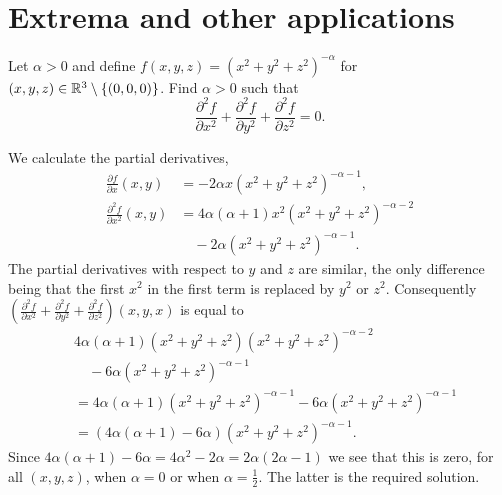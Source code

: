\section{Extrema and other applications}

\begin{task}
    Let \(\alpha>0\) and define \(f(x,y,z) = {(x^2 + y^2 + z^2)}^{-\alpha}\) for \((x,y,z)\in \mathbb{R}^3 \setminus \{(0,0,0)\}\).
    Find \(\alpha>0\) such that
    \[
        \frac{\partial^2 f}{\partial x^2} + \frac{\partial^2 f}{\partial y^2}  +\frac{\partial^2 f}{\partial z^2}  =0.
    \]
\end{task}

\begin{solution}
    We calculate the partial derivatives,
    \[
        \begin{aligned}
            \tfrac{\partial f}{\partial x}(x,y)
             & = -2 \alpha x{(x^2 + y^2 + z^2)}^{-\alpha-1},           \\
            \tfrac{\partial^2 f}{\partial x^2}(x,y)
             & = 4 \alpha(\alpha+1) x^2{(x^2 + y^2 + z^2)}^{-\alpha-2} \\
             & \quad -2 \alpha {(x^2 + y^2 + z^2)}^{-\alpha-1}.
        \end{aligned}
    \]
    The partial derivatives with respect to \(y\) and \(z\) are similar, the only difference being that the first \(x^2\) in the first term is replaced by \(y^2\) or \(z^2\).
    Consequently \(\left(\tfrac{\partial^2 f}{\partial x^2} + \tfrac{\partial^2 f}{\partial y^2}  +\tfrac{\partial^2 f}{\partial z^2}\right)(x,y,x)\) is equal to
    \[
        \begin{aligned}
             & 4 \alpha(\alpha+1)( x^2 + y^2 + z^2){(x^2 + y^2 + z^2)}^{-\alpha-2} \\
             & \quad -6 \alpha {(x^2 + y^2 + z^2)}^{-\alpha-1}                     \\
             & =  4 \alpha(\alpha+1){(x^2 + y^2 + z^2)}^{-\alpha-1}               %
              -6 \alpha {(x^2 + y^2 + z^2)}^{-\alpha-1}                     \\
             & = (4 \alpha(\alpha+1) -6 \alpha ) {(x^2 + y^2 + z^2)}^{-\alpha-1}.
        \end{aligned}
    \]
    Since \(4 \alpha(\alpha+1) - 6 \alpha = 4\alpha^2 - 2\alpha = 2\alpha(2\alpha -1)\) we see that this is zero, for all \((x,y,z)\), when \(\alpha=0\) or when \(\alpha = \frac{1}{2}\).
    The latter is the required solution.
\end{solution}


